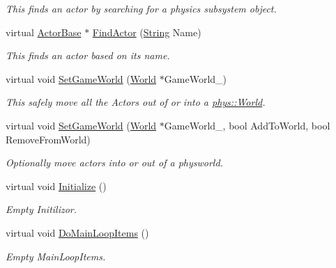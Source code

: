 \begin{DoxyCompactItemize}
\begin{DoxyCompactList}\small\item\em This finds an actor by searching for a physics subsystem object. \item\end{DoxyCompactList}\item 
virtual \hyperlink{classphys_1_1ActorBase}{ActorBase} $\ast$ \hyperlink{classphys_1_1ActorContainerVector_ae04f8c6dd9b07ef9c1456707be9e155b}{FindActor} (\hyperlink{namespacephys_aa03900411993de7fbfec4789bc1d392e}{String} Name)
\begin{DoxyCompactList}\small\item\em This finds an actor based on its name. \item\end{DoxyCompactList}\item 
virtual void \hyperlink{classphys_1_1ActorContainerVector_ab4c1394254057465f7a2f89b87dc49aa}{SetGameWorld} (\hyperlink{classphys_1_1World}{World} $\ast$GameWorld\_\-)
\begin{DoxyCompactList}\small\item\em This safely move all the Actors out of or into a \hyperlink{classphys_1_1World}{phys::World}. \item\end{DoxyCompactList}\item 
virtual void \hyperlink{classphys_1_1ActorContainerVector_a721d0cde6fc4f1e8d3b33867cd5c82df}{SetGameWorld} (\hyperlink{classphys_1_1World}{World} $\ast$GameWorld\_\-, bool AddToWorld, bool RemoveFromWorld)
\begin{DoxyCompactList}\small\item\em Optionally move actors into or out of a physworld. \item\end{DoxyCompactList}\item 
virtual void \hyperlink{classphys_1_1ActorContainerVector_adcebf4329a587669f74e1eacc1e6912c}{Initialize} ()
\begin{DoxyCompactList}\small\item\em Empty Initilizor. \item\end{DoxyCompactList}\item 
virtual void \hyperlink{classphys_1_1ActorContainerVector_a883e59ac1674421bac143088a6cf07c8}{DoMainLoopItems} ()
\begin{DoxyCompactList}\small\item\em Empty MainLoopItems. \item\end{DoxyCompactList}\end{DoxyCompactItemize}
